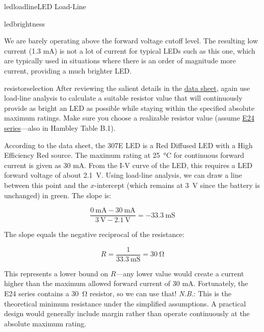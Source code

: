\begin{mainquestion}{ledloadline}{LED Load-Line}
\begin{partquestion}{ledbrightness}
\begin{answer}
We are barely operating above the forward voltage cutoff level. The resulting low current (1.3 mA) is not a lot of current for typical LEDs such as this one, which are typically used in situations where there is an order of magnitude more current, providing a much brighter LED.
\end{answer}
\end{partquestion}

\begin{partquestion}{resistorselection}
{After reviewing the salient details in the \href{https://www.jameco.com/Jameco/Products/ProdDS/697522.pdf}{data sheet}, again use load-line analysis to calculate a suitable resistor value that will continuously provide as bright an LED as possible while staying within the specified absolute maximum ratings. Make sure you choose a realizable resistor value (assume \href{https://asenergi.com/pdf/resistors/standard-resistor-values-e24.pdf}{E24 series}---also in Hambley Table B.1).}

\begin{answer}
According to the data sheet, the 307E LED is a Red Diffused LED with a High Efficiency Red source. The maximum rating at 25~°C for continuous forward current is given as 30 mA. From the I-V curve of the LED, this requires a LED forward voltage of about \qty{2.1}{\volt}. Using load-line analysis, we can draw a line between this point and the $x$-intercept (which remains at \qty{3}{\volt} since the battery is unchanged) in green. The slope is:

\[
\frac{\qty{0}{\milli\ampere} - \qty{30}{\milli\ampere}}{\qty{3}{\volt} - \qty{2.1}{\volt}} = -\qty{33.3}{\milli\siemens}
\]

The slope equals the negative reciprocal of the resistance:

\[
R = \frac{1}{\qty{33.3}{\milli\siemens}} = \qty{30}{\ohm}
\]

This represents a lower bound on $R$---any lower value would create a current higher than the maximum allowed forward current of 30 mA. Fortunately, the E24 series contains a \qty{30}{\ohm} resistor, so we can use that! \textit{N.B.}: This is the theoretical minimum resistance under the simplified assumptions. A practical design would generally include margin rather than operate continuously at the absolute maximum rating.
\end{answer}
\end{partquestion}


\end{mainquestion}
